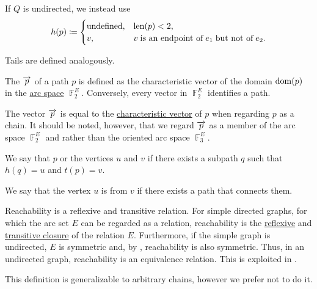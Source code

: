 \begin{definition}
\begin{thmenum}
    If \( Q \) is undirected, we instead use
    \begin{equation}\label{eq:def:quiver_directed_path/endpoints/head_undirected}
      h(p) \coloneqq \begin{cases}
        \T{undefined}, &\len(p) < 2, \\
        v,             &v \T{is an endpoint of} e_1 \T{but not of} e_2.
      \end{cases}
    \end{equation}

    Tails are defined analogously.

     The  \( \overrightarrow{p} \) of a path \( p \) is defined as the characteristic vector of the domain \( \operatorname{dom}(p) \) in the \hyperref[def:multigraph_vector_spaces/arc]{arc space} \( \BbbF_2^E \). Conversely, every vector in \( \BbbF_2^E \) identifies a path.

    The vector \( \overrightarrow{p} \) is equal to the \hyperref[def:quiver_adjacency_chain/characteristic_vector]{characteristic vector} of \( p \) when regarding \( p \) as a chain. It should be noted, however, that we regard \( \overrightarrow{p} \) as a member of the arc space \( \BbbF_2^E \) and rather than the oriented arc space \( \BbbF_3^E \).

     We say that \( p \)  or  the vertices \( u \) and \( v \) if there exists a subpath \( q \) such that \( h(q) = u \) and \( t(p) = v \).

    We say that the vertex \( u \) is  from \( v \) if there exists a path that connects them.

    Reachability is a reflexive and transitive relation. For simple directed graphs, for which the arc set \( E \) can be regarded as a relation, reachability is the \hyperref[def:relation_closures/reflexive]{reflexive} and \hyperref[def:relation_closures/transitive]{transitive closure} of the relation \( E \). Furthermore, if the simple graph is undirected, \( E \) is symmetric and, by , reachability is also symmetric. Thus, in an undirected graph, reachability is an equivalence relation. This is exploited in .

    This definition is generalizable to arbitrary chains, however we prefer not to do it.
  \end{thmenum}
\end{definition}

